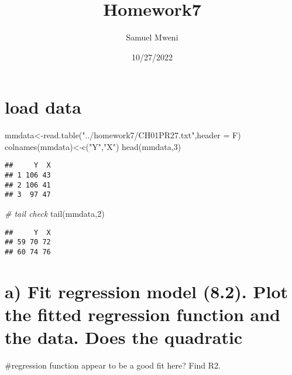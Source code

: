 \documentclass[
]{article}
\title{Homework7}
\author{Samuel Mweni}
\date{10/27/2022}
\newenvironment{Shaded}{\begin{snugshade}}{\end{snugshade}}
\newcommand{\AttributeTok}[1]{\textcolor[rgb]{0.77,0.63,0.00}{#1}}
\newcommand{\CommentTok}[1]{\textcolor[rgb]{0.56,0.35,0.01}{\textit{#1}}}
\newcommand{\DecValTok}[1]{\textcolor[rgb]{0.00,0.00,0.81}{#1}}
\newcommand{\FunctionTok}[1]{\textcolor[rgb]{0.00,0.00,0.00}{#1}}
\newcommand{\NormalTok}[1]{#1}
\newcommand{\OtherTok}[1]{\textcolor[rgb]{0.56,0.35,0.01}{#1}}
\newcommand{\StringTok}[1]{\textcolor[rgb]{0.31,0.60,0.02}{#1}}
\begin{document}
\maketitle

{
\hypersetup{linkcolor=}
\setcounter{tocdepth}{1}
\tableofcontents
}
\hypertarget{load-data}{%
\section{load data}\label{load-data}}

\begin{Shaded}
\begin{Highlighting}[]
\NormalTok{mmdata}\OtherTok{\textless{}{-}}\FunctionTok{read.table}\NormalTok{(}\StringTok{"../homework7/CH01PR27.txt"}\NormalTok{,}\AttributeTok{header =}\NormalTok{ F)}
\FunctionTok{colnames}\NormalTok{(mmdata)}\OtherTok{\textless{}{-}}\FunctionTok{c}\NormalTok{(}\StringTok{"Y"}\NormalTok{,}\StringTok{"X"}\NormalTok{)}
\FunctionTok{head}\NormalTok{(mmdata,}\DecValTok{3}\NormalTok{)}
\end{Highlighting}
\end{Shaded}

\begin{verbatim}
##     Y  X
## 1 106 43
## 2 106 41
## 3  97 47
\end{verbatim}

\begin{Shaded}
\begin{Highlighting}[]
\CommentTok{\# tail check}
\FunctionTok{tail}\NormalTok{(mmdata,}\DecValTok{2}\NormalTok{)}
\end{Highlighting}
\end{Shaded}

\begin{verbatim}
##     Y  X
## 59 70 72
## 60 74 76
\end{verbatim}

\hypertarget{a-fit-regression-model-8.2.-plot-the-fitted-regression-function-and-the-data.-does-the-quadratic}{%
\section{a) Fit regression model (8.2). Plot the fitted regression
function and the data. Does the
quadratic}\label{a-fit-regression-model-8.2.-plot-the-fitted-regression-function-and-the-data.-does-the-quadratic}}

\#regression function appear to be a good fit here? Find R2.
\end{document}
